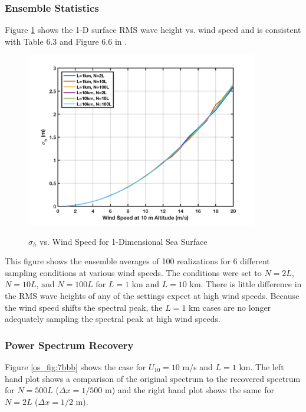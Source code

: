 \subsubsection {Ensemble Statistics}
Figure \ref{os_fig:7fff} shows the 1-D surface RMS wave height vs. wind speed and is consistent with Table 6.3 and Figure 6.6 in \cite{temper_guide}.

\begin{figure}[H]
  \begin{center}
\includegraphics[width=4in]{../media/Ocean_Surface/1d_ensemble_rms.png}
  \end{center}
  \renewcommand{\baselinestretch}{1} \small\normalsize
  \begin{quote}
    \caption[$\sigma_h$ vs. Wind Speed for 1-Dimensional Sea Surface]{$\sigma_h$ vs. Wind Speed for 1-Dimensional Sea Surface\label{os_fig:7fff}}
  \end{quote}
\end{figure}
\renewcommand{\baselinestretch}{2} \small\normalsize

This figure shows the ensemble averages of 100 realizations for 6 different sampling conditions at various wind speeds. The conditions were set to $N = 2L$, $N = 10L$, and $N = 100L$ for $L = 1$ km and $L = 10$ km. There is little difference in the RMS wave heights of any of the settings expect at high wind speeds. Because the wind speed shifts the spectral peak, the $L = 1$ km cases are no longer adequately sampling the spectral peak at high wind speeds.

\subsubsection {Power Spectrum Recovery}
Figure \ref{os_fig:7bbb} shows the case for $U_{10} = 10$ m/s and $L = 1$ km. The left hand plot shows a comparison of the original spectrum to the recovered spectrum for $N = 500L$ ($\Delta x = 1/500$ m) and the right hand plot shows the same for $N=2L$ ($\Delta x = 1/2$ m).

